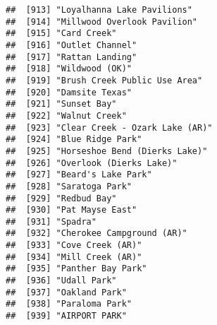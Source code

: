 \documentclass[
]{article}
\begin{document}
\begin{verbatim}
##  [913] "Loyalhanna Lake Pavilions"                                                           
##  [914] "Millwood Overlook Pavilion"                                                          
##  [915] "Card Creek"                                                                          
##  [916] "Outlet Channel"                                                                      
##  [917] "Rattan Landing"                                                                      
##  [918] "Wildwood (OK)"                                                                       
##  [919] "Brush Creek Public Use Area"                                                         
##  [920] "Damsite Texas"                                                                       
##  [921] "Sunset Bay"                                                                          
##  [922] "Walnut Creek"                                                                        
##  [923] "Clear Creek - Ozark Lake (AR)"                                                       
##  [924] "Blue Ridge Park"                                                                     
##  [925] "Horseshoe Bend (Dierks Lake)"                                                        
##  [926] "Overlook (Dierks Lake)"                                                              
##  [927] "Beard's Lake Park"                                                                   
##  [928] "Saratoga Park"                                                                       
##  [929] "Redbud Bay"                                                                          
##  [930] "Pat Mayse East"                                                                      
##  [931] "Spadra"                                                                              
##  [932] "Cherokee Campground (AR)"                                                            
##  [933] "Cove Creek (AR)"                                                                     
##  [934] "Mill Creek (AR)"                                                                     
##  [935] "Panther Bay Park"                                                                    
##  [936] "Udall Park"                                                                          
##  [937] "Oakland Park"                                                                        
##  [938] "Paraloma Park"                                                                       
##  [939] "AIRPORT PARK"                                                                        

\end{verbatim}
\end{document}
